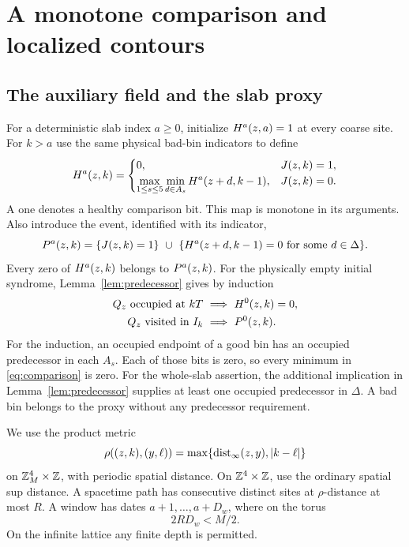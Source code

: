 \section{A monotone comparison and localized contours}\label{sec:contours}

\subsection{The auxiliary field and the slab proxy}

For a deterministic slab index \(a\ge0\), initialize
\(H^a(z,a)=1\) at every coarse site. For \(k>a\) use the same
physical bad-bin indicators to define
\begin{equation}\label{eq:comparison}
 H^a(z,k)=
 \begin{cases}
 0,&J(z,k)=1,\\
 \displaystyle\max_{1\le s\le5}\min_{d\in A_s}
                     H^a(z+d,k-1),&J(z,k)=0.
 \end{cases}
\end{equation}
A one denotes a healthy comparison bit. This map is monotone in its
arguments. Also introduce the event, identified with its indicator,
\begin{equation}\label{eq:proxy}
 P^a(z,k)=
 \{J(z,k)=1\}\ \cup\
 \{H^a(z+d,k-1)=0\text{ for some }d\in\Delta\}.
\end{equation}
Every zero of \(H^a(z,k)\) belongs to \(P^a(z,k)\).
For the physically empty initial syndrome,
Lemma~\ref{lem:predecessor} gives by induction
\begin{equation}\label{eq:domination}
 \begin{split}
 Q_z\text{ occupied at }kT&\ \Longrightarrow\
                         H^0(z,k)=0,\\
 Q_z\text{ visited in }I_k&\ \Longrightarrow\
                         P^0(z,k).
 \end{split}
\end{equation}
For the induction, an occupied endpoint of a good bin has an occupied
predecessor in each \(A_s\). Each of those bits is zero, so every
minimum in \eqref{eq:comparison} is zero. For the whole-slab assertion,
the additional implication in Lemma~\ref{lem:predecessor} supplies at
least one occupied predecessor in \(\Delta\). A bad bin belongs to
the proxy without any predecessor requirement.

We use the product metric
\begin{equation}\label{eq:productmetric}
 \rho((z,k),(y,\ell))=\max\{\operatorname{dist}_\infty(z,y),|k-\ell|\}
\end{equation}
on \(\mathbb Z_M^4\times\mathbb Z\), with periodic spatial distance. On
\(\mathbb Z^4\times\mathbb Z\), use the ordinary spatial sup distance. A spacetime
path has consecutive distinct sites at \(\rho\)-distance at most
\(R\). A window has dates \(a+1,\ldots,a+D_w\), where on the torus
\begin{equation}\label{eq:short-window}
 2RD_w<M/2.
\end{equation}
On the infinite lattice any finite depth is permitted.

